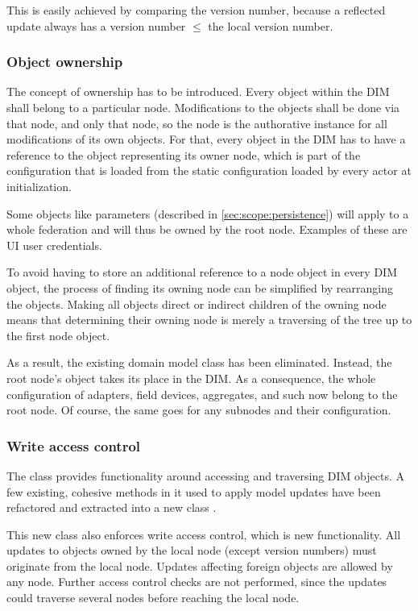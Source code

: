 This is easily achieved by comparing the version number, because a reflected
update always has a version number $\leqslant$ the local version number.


\subsubsection{Object ownership}\label{sec:approach:dim:ownership}
The concept of ownership has to be introduced. Every object within the DIM
shall belong to a particular node. Modifications to the objects shall be done via
that node, and only that node, so the node is the authorative instance for all modifications of its own objects.
For that, every object in the DIM has to have a reference
to the object representing its owner node, which is part of
the configuration that is loaded from the static configuration loaded by every
actor at initialization.

Some objects like parameters (described in \autoref{sec:scope:persistence})
will apply to a whole federation and will thus be owned by the root node.
Examples of these are UI user credentials.

To avoid having to store an additional reference to a node object in every DIM
object, the process of finding its owning node can be simplified by rearranging
the objects. Making all objects direct or indirect children of the owning node
means that determining their owning node is merely a traversing of the tree up
to the first node object.

As a result, the existing domain model class 
has been eliminated. Instead, the root node's
 object takes its place in the DIM. As a
consequence, the whole configuration of adapters, field devices, aggregates,
and such now belong to the root node. Of course, the same goes for any subnodes
and their configuration.

\subsubsection{Write access control}
The class  provides functionality around accessing
and traversing DIM objects. A few existing, cohesive methods in it used to
apply model updates have been refactored and extracted into a new class
.

This new class also enforces write access control, which is new functionality.
All updates to objects owned by the local node (except version numbers) must
originate from the local node. Updates affecting foreign objects are allowed by
any node. Further access control checks are not performed, since the updates
could traverse several nodes before reaching the local node.

